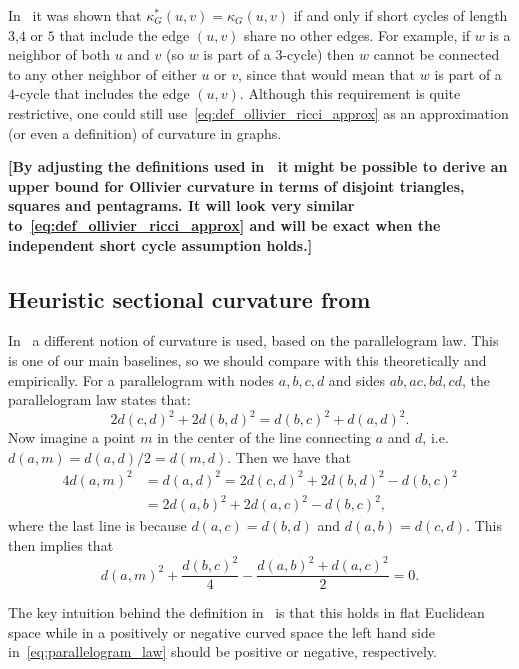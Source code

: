 \documentclass{article}
\begin{document}
In~\cite{kelly2019self} it was shown that $\kappa_G^\ast(u,v) = \kappa_G(u,v)$ if and only if short cycles of length $3$,$4$ or $5$ that include the edge $(u,v)$ share no other edges. For example, if $w$ is a neighbor of both $u$ and $v$ (so $w$ is part of a $3$-cycle) then $w$ cannot be connected to any other neighbor of either $u$ or $v$, since that would mean that $w$ is part of a $4$-cycle that includes the edge $(u,v)$. Although this requirement is quite restrictive, one could still use~\eqref{eq:def_ollivier_ricci_approx} as an approximation (or even a definition) of curvature in graphs.

{\bf [By adjusting the definitions used in~\cite{kelly2019self} it might be possible to derive an upper bound for Ollivier curvature in terms of disjoint triangles, squares and pentagrams. It will look very similar to~\eqref{eq:def_ollivier_ricci_approx} and will be exact when the independent short cycle assumption holds.]}

\subsection{Heuristic sectional curvature from~\cite{gu2019learning}}

In~\cite{gu2019learning} a different notion of curvature is used, based on the parallelogram law. This is one of our main baselines, so we should compare with this theoretically and empirically. For a parallelogram with nodes $a,b,c,d$ and sides $ab, ac, bd, cd$, the parallelogram law states that:
\[
	2d(c,d)^2 + 2d(b,d)^2 = d(b,c)^2 + d(a,d)^2.
\]
Now imagine a point $m$ in the center of the line connecting $a$ and $d$, i.e. $d(a,m)=d(a,d)/2=d(m,d)$. Then we have that
\begin{align*}
	4d(a,m)^2 &= d(a,d)^2 = 2d(c,d)^2 + 2d(b,d)^2 - d(b,c)^2 \\
	&= 2d(a,b)^2 + 2d(a,c)^2 - d(b,c)^2,
\end{align*}
where the last line is because $d(a,c) = d(b,d)$ and $d(a,b) = d(c,d)$. This then implies that
\begin{equation}\label{eq:parallelogram_law}
	d(a,m)^2 + \frac{d(b,c)^2}{4} - \frac{d(a,b)^2 + d(a,c)^2}{2} = 0.
\end{equation}

The key intuition behind the definition in~\cite{gu2019learning} is that this holds in flat Euclidean space while in a positively or negative curved space the left hand side in~\eqref{eq:parallelogram_law} should be positive or negative, respectively. 
\end{document}
